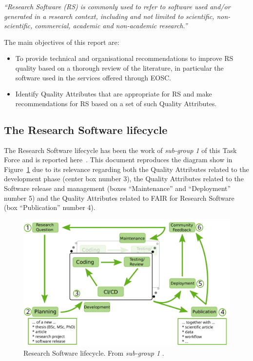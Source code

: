 \textit{``Research Software (RS) is commonly used to refer to software used and/or generated in a research context, including and not limited to scientific, non-scientific, commercial, academic and non-academic research.''}

\label{def_rs}

The main objectives of this report are:

\begin{itemize}
    \item To provide technical and organisational recommendations to improve RS quality based on a thorough review of the literature, in particular the software used in the services offered through EOSC.

    \item Identify Quality Attributes that are appropriate for RS and make recommendations for RS based on a set of such Quality Attributes.

\end{itemize}

\subsection{The Research Software lifecycle}

The Research Software lifecycle has been the work of \textit{sub-group 1} of this Task Force and is reported here~\cite{sg1tf2023}. This document reproduces the diagram show in Figure~\ref{fig:rslifecycle} due to its relevance regarding both the Quality Attributes related to the development phase (center box number 3), the Quality Attributes related to the Software release and management (boxes ``Maintenance'' and ``Deployment'' number 5) and the Quality Attributes related to FAIR for Research Software (box ``Publication'' number 4).

\begin{figure}[h]
    \centering
    \includegraphics[width=0.90\linewidth]{imgs/rs_lifecycle.png}
    \caption{Research Software lifecycle. From \textit{sub-group 1} \cite{sg1tf2023}.}
    \label{fig:rslifecycle}
\end{figure}

